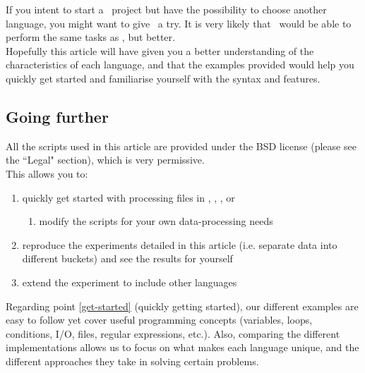If you intent to start a \python\ project but have the possibility to choose another language, you might want to give \julia\ a try.
It is very likely that \julia\ would be able to perform the same tasks as \python, but better. \\

Hopefully this article will have given you a better understanding of the characteristics of each language, and that the examples provided would help you quickly get started and familiarise yourself with the syntax and features.

\newpage
\subsection*{Going further}

All the scripts used in this article are provided under the BSD license (please see the ``Legal" section), which is very permissive. \\

This allows you to:

\begin{enumerate}
	\item \label{get-started}
	quickly get started with processing files in \python, \awk, \perl, or \julia 

	\begin{enumerate}
		\item \label{modify-scripts}
		modify the scripts for your own data-processing needs 
	\end{enumerate}
	
	\item \label{reproduce-experiments}
	reproduce the experiments detailed in this article (i.e. separate data into different buckets) and see the results for yourself
	
	\item \label{extend-experiment}
	extend the experiment to include other languages 
\end{enumerate}

\bigskip

Regarding point \ref{get-started} (quickly getting started), our different examples are easy to follow yet cover useful programming concepts (variables, loops, conditions, I/O, files, regular expressions, etc.). 
Also, comparing the different implementations allows us to focus on what makes each language unique, and the different approaches they take in solving certain problems. \\



